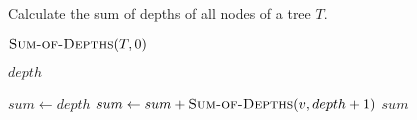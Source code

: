 
\begin{algorithm}[H]
  \caption{Calculate the sum of depths of all nodes of a tree $T$.}
  \label{alg:sum-of-depths}
  \begin{algorithmic}[1]
      \State \Return $\Call{Sum-of-Depths}{T, 0}$ 
    \EndProcedure

    \Statex
     
        \State \Return $depth$
      \EndIf

      \hStatex
      \State $sum \gets depth$
	\State $sum \gets sum + \Call{Sum-of-Depths}{v, depth + 1}$
      \EndFor
      \State \Return $sum$
    \EndProcedure
  \end{algorithmic}
\end{algorithm}